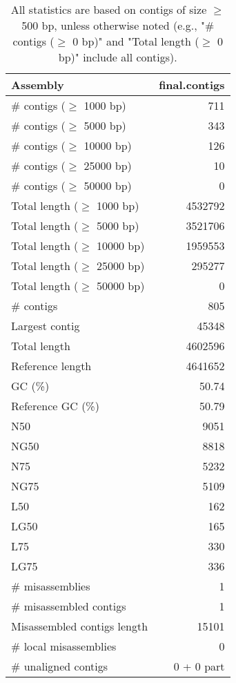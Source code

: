 \documentclass[12pt,a4paper]{article}
\begin{document}
\begin{table}[ht]
\begin{center}
\caption{All statistics are based on contigs of size $\geq$ 500 bp, unless otherwise noted (e.g., "\# contigs ($\geq$ 0 bp)" and "Total length ($\geq$ 0 bp)" include all contigs).}
\begin{tabular}{|l*{1}{|r}|}
\hline
Assembly & final.contigs \\ \hline
\# contigs ($\geq$ 1000 bp) & 711 \\ \hline
\# contigs ($\geq$ 5000 bp) & 343 \\ \hline
\# contigs ($\geq$ 10000 bp) & 126 \\ \hline
\# contigs ($\geq$ 25000 bp) & 10 \\ \hline
\# contigs ($\geq$ 50000 bp) & 0 \\ \hline
Total length ($\geq$ 1000 bp) & 4532792 \\ \hline
Total length ($\geq$ 5000 bp) & 3521706 \\ \hline
Total length ($\geq$ 10000 bp) & 1959553 \\ \hline
Total length ($\geq$ 25000 bp) & 295277 \\ \hline
Total length ($\geq$ 50000 bp) & 0 \\ \hline
\# contigs & 805 \\ \hline
Largest contig & 45348 \\ \hline
Total length & 4602596 \\ \hline
Reference length & 4641652 \\ \hline
GC (\%) & 50.74 \\ \hline
Reference GC (\%) & 50.79 \\ \hline
N50 & 9051 \\ \hline
NG50 & 8818 \\ \hline
N75 & 5232 \\ \hline
NG75 & 5109 \\ \hline
L50 & 162 \\ \hline
LG50 & 165 \\ \hline
L75 & 330 \\ \hline
LG75 & 336 \\ \hline
\# misassemblies & 1 \\ \hline
\# misassembled contigs & 1 \\ \hline
Misassembled contigs length & 15101 \\ \hline
\# local misassemblies & 0 \\ \hline
\# unaligned contigs & 0 + 0 part \\ \hline

\end{tabular}
\end{center}
\end{table}
\end{document}
